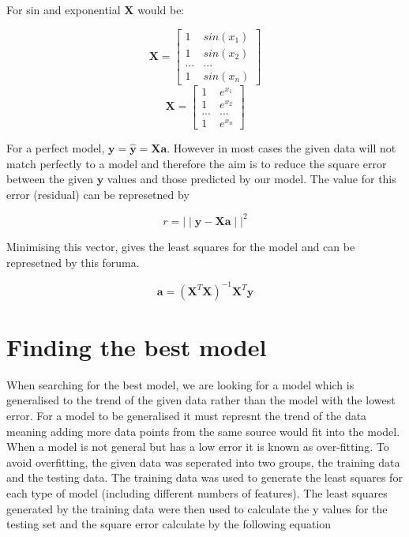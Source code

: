 \documentclass[]{article}
\begin{document}
For sin and exponential $\boldsymbol{X}$ would be:
\begin{multicols}{2}
  \begin{equation}
    \boldsymbol{X} = 
    \begin{bmatrix}
      1   & sin(x_1)        \\
      1   & sin(x_2)   \\
      ... & ...    \\
      1   & sin(x_n)   
    \end{bmatrix}
  \end{equation}\break
  \begin{equation}
    \boldsymbol{X} = 
    \begin{bmatrix}
      1     & e^{x_1}     \\
      1     & e^{x_2}  \\
      ...   & ...     \\
      1     & e^{x_n}  
    \end{bmatrix}
  \end{equation}
\end{multicols}

For a perfect model, $\boldsymbol{y} = \boldsymbol{\hat{y}} = \boldsymbol{Xa}$. However in most cases the given data
will not match perfectly to a model and therefore the aim is to reduce
the square error between the given $\boldsymbol{y}$ values and those predicted by our model.
The value for this error (residual) can be represetned by

\begin{equation}
  r = {\mid \mid \boldsymbol{y} - \boldsymbol{Xa} \mid \mid}^2
\end{equation}

Minimising this vector, gives the least squares for the model and can be
represetned by this foruma.

\begin{equation}
  \boldsymbol{a} = (\boldsymbol{X}^T \boldsymbol{X})^{-1}\boldsymbol{X}^T\boldsymbol{y}
\end{equation}

\section{Finding the best model}

When searching for the best model, we are looking for a model which is
generalised to the trend of the given data rather than the model with the lowest error. For a model to be
generalised it must represnt the trend of the data meaning adding more data
points from the same source would fit into the model. When a model is not
general but has a low error it is known as over-fitting. To avoid overfitting, the given data was seperated
into two groups, the training data and the testing data. The training data was
used to generate the least squares for each type of model (including different
numbers of features). The least squares
generated by the training data were then used to calculate the y values for the
testing set and the square error calculate by the following equation
\end{document}
